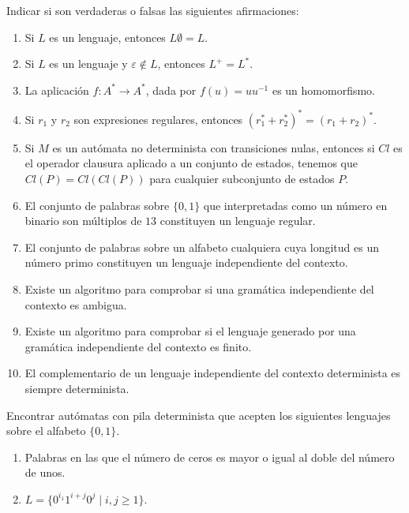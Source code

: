 \documentclass[12pt]{article}
\begin{document}
    \begin{ejercicio}[2.5 puntos]
        Indicar si son verdaderas o falsas las siguientes afirmaciones:
        \begin{enumerate}
            \item Si $L$ es un lenguaje, entonces $L\emptyset = L$.
            \item Si $L$ es un lenguaje y $\varepsilon \notin L$, entonces $L^+ = L^*$.
            \item La aplicación $f : A^* \to A^*$, dada por $f(u) = uu^{-1}$ es un homomorfismo.
            \item Si $r_1$ y $r_2$ son expresiones regulares, entonces $(r_1^* + r_2^*)^* = (r_1 + r_2)^*$.
            \item Si $M$ es un autómata no determinista con transiciones nulas, entonces si $Cl$ es el operador clausura aplicado a un conjunto de estados, tenemos que $Cl(P) = Cl(Cl(P))$ para cualquier subconjunto de estados $P$.
            \item El conjunto de palabras sobre $\{0, 1\}$ que interpretadas como un número en binario son múltiplos de $13$ constituyen un lenguaje regular.
            \item El conjunto de palabras sobre un alfabeto cualquiera cuya longitud es un número primo constituyen un lenguaje independiente del contexto.
            \item Existe un algoritmo para comprobar si una gramática independiente del contexto es ambigua.
            \item Existe un algoritmo para comprobar si el lenguaje generado por una gramática independiente del contexto es finito.
            \item El complementario de un lenguaje independiente del contexto determinista es siempre determinista.
        \end{enumerate}
    \end{ejercicio}

    \begin{ejercicio}[2.5 puntos]
        Encontrar autómatas con pila determinista que acepten los siguientes lenguajes sobre el alfabeto $\{0, 1\}$.
        \begin{enumerate}
            \item Palabras en las que el número de ceros es mayor o igual al doble del número de unos.
            \item $L = \{0^{i_1}1^{i+j}0^j \mid i, j \geq 1\}$.
        \end{enumerate}
    \end{ejercicio}
\end{document}
